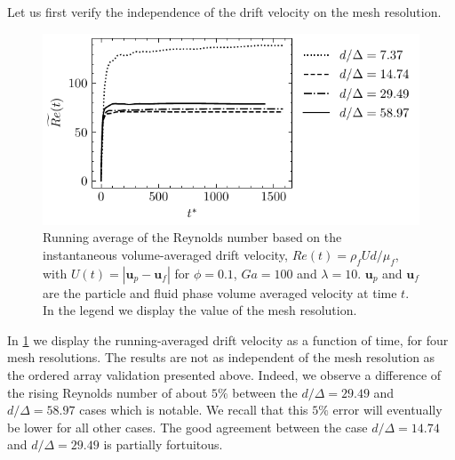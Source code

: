 Let us first verify the independence of the drift velocity on the mesh resolution. 
\begin{figure}[h!]
    \centering
    \includegraphics[height = 0.3\textwidth]{image/HOMOGENEOUS_NEW/VAL/Re.pdf}
    \caption{
        Running average of the Reynolds number based on the instantaneous volume-averaged drift velocity, $Re(t) = \rho_fU d /\mu_f$, with $U(t) = |\textbf{u}_p - \textbf{u}_f|$ for $\phi = 0.1$, $Ga=100$ and $\lambda =10$.
        $\textbf{u}_p$ and $\textbf{u}_f$ are the particle and fluid phase volume averaged velocity at time $t$.
        In the legend we display the value of the mesh resolution. 
    }
    \label{fig:Re}
\end{figure}
In \ref{fig:Re} we display the running-averaged drift velocity as a function of time, for four mesh resolutions. 
The results are not as independent of the mesh resolution as the ordered array validation presented above. 
Indeed, we observe a difference of the rising Reynolds number of about $5\%$ between the $d/\Delta = 29.49$ and $d/\Delta = 58.97$ cases which is notable.
We recall that this $5\%$ error will eventually be lower for all other cases. 
The good agreement between the case  $d/\Delta = 14.74$ and $d/\Delta = 29.49$ is partially fortuitous.

